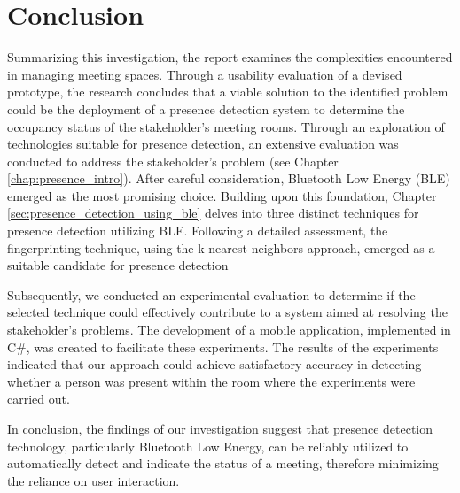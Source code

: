 \chapter{Conclusion}
Summarizing this investigation, the report examines the complexities encountered in managing meeting spaces. 
Through a usability evaluation of a devised prototype, the research concludes that a viable solution to the identified problem could be the deployment of a presence detection system to determine the occupancy status of the stakeholder's meeting rooms.
Through an exploration of technologies suitable for presence detection, an extensive evaluation was conducted to address the stakeholder's problem (see Chapter \ref{chap:presence_intro}). 
After careful consideration, Bluetooth Low Energy (BLE) emerged as the most promising choice. 
Building upon this foundation, Chapter \ref{sec:presence_detection_using_ble} delves into three distinct techniques for presence detection utilizing BLE.
Following a detailed assessment, the fingerprinting technique, using the k-nearest neighbors approach, emerged as a suitable candidate for presence detection

Subsequently, we conducted an experimental evaluation to determine if the selected technique could effectively contribute to a system aimed at resolving the stakeholder's problems. 
The development of a mobile application, implemented in C\#, was created to facilitate these experiments. 
The results of the experiments indicated that our approach could achieve satisfactory accuracy in detecting whether a person was present within the room where the experiments were carried out.

In conclusion, the findings of our investigation suggest that presence detection technology, particularly Bluetooth Low Energy, can be reliably utilized to automatically detect and indicate the status of a meeting, therefore minimizing the reliance on user interaction.